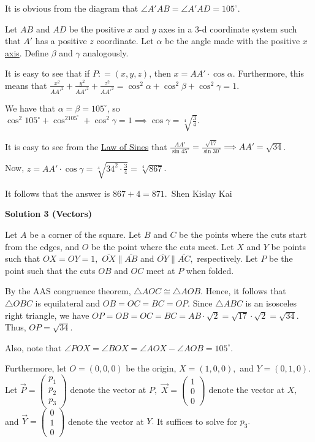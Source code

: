 \begin{enumerate}
 It is obvious from the diagram that $\angle A'AB = \angle A'AD = 105^\circ$.

 Let $AB$ and $AD$ be the positive $x$ and $y$ axes in a 3-d coordinate system such that $A'$ has a positive $z$ coordinate. Let $\alpha$ be the angle made with the positive $x$ \href{https://artofproblemsolving.com/wiki/index.php?title=Axis}{axis}. Define $\beta$ and $\gamma$ analogously.

 It is easy to see that if $P: = (x,y,z)$, then $x = AA'\cdot \cos\alpha$. Furthermore, this means that $\frac {x^2}{AA'^2} + \frac {y^2}{AA'^2} + \frac {z^2}{AA'^2} = \cos^2\alpha + \cos^2\beta + \cos^2\gamma = 1$.

 We have that $\alpha = \beta = 105^\circ$, so $\cos^2 105^\circ + \cos^2105^\circ + \cos^2\gamma = 1\implies \cos\gamma = \sqrt [4]{\frac {3}{4}}$.

 It is easy to see from the \href{https://artofproblemsolving.com/wiki/index.php?title=Law\_of\_Sines}{Law of Sines} that $\frac {AA'}{\sin 45^\circ} = \frac {\sqrt {17}}{\sin 30^\circ}\implies AA' = \sqrt {34}$.

 Now, $z = AA'\cdot \cos\gamma = \sqrt [4]{34^2\cdot \frac {3}{4}} = \sqrt [4]{867}$.

 It follows that the answer is $867 + 4 = \boxed{871}$.~Shen Kislay Kai

 



\textbf{Solution 3 (Vectors)}

Let $A$ be a corner of the square. Let $B$ and $C$ be the points where the cuts start from the edges, and $O$ be the point where the cuts meet. Let $X$ and $Y$ be points such that $OX=OY=1,$ $\overline{OX} \parallel \overline{AB}$ and $\overline{OY} \parallel \overline{AC},$ respectively. Let $P$ be the point such that the cuts $OB$ and $OC$ meet at $P$ when folded. 

 By the AAS congruence theorem, $\triangle{AOC} \cong \triangle{AOB}.$ Hence, it follows that $\triangle{OBC}$ is equilateral and $OB=OC=BC=OP.$ Since $\triangle{ABC}$ is an isosceles right triangle, we have $OP=OB=OC=BC=AB\cdot\sqrt{2}=\sqrt{17}\cdot\sqrt{2}=\sqrt{34}.$ Thus, $OP=\sqrt{34}.$

 Also, note that $\angle{POX}=\angle{BOX}=\angle{AOX}-\angle{AOB}=105^\circ.$

 Furthermore, let $O=(0,0,0)$ be the origin, $X=(1,0,0),$ and $Y=(0,1,0).$ Let $\overrightarrow{P}=\begin{pmatrix} p_1 \\ p_2 \\ p_3 \end{pmatrix}$ denote the vector at $P,$ $\overrightarrow{X}=\begin{pmatrix} 1 \\ 0 \\ 0 \end{pmatrix}$ denote the vector at $X,$ and $\overrightarrow{Y}=\begin{pmatrix} 0 \\ 1 \\ 0 \end{pmatrix}$ denote the vector at $Y.$ It suffices to solve for $p_3.$


\end{enumerate}
